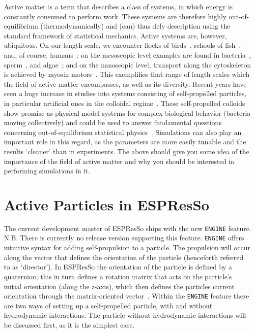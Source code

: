 \documentclass[aip,jcp,reprint,a4paper,onecolumn,amsmath]{revtex4-1}
\newcommand\code{\lstinline}
\newcommand{\es}{\mbox{\textsf{ESPResSo}}\xspace}
\begin{document}
Active matter is a term that describes a class of systems, in which energy is constantly consumed to perform work. These systems are therefore highly out-of-equilibrium (thermodynamically) and (can) thus defy description using the standard framework of statistical mechanics. Active systems are, however, ubiquitous. On our length scale, we encounter flocks of birds~\cite{Ballerini_08}, schools of fish~\cite{Katz_11}, and, of course, humans~\cite{Helbing_00,Zhang_13,Sliverberg_13}; on the mesoscopic level examples are found in bacteria~\cite{Sokolov_07,Schwarz-Linek_12,Reufer_14}, sperm~\cite{Woolley_03,Riedel_05,Ma_14}, and algae~\cite{Polin_09,Geyer_13}; and on the nanoscopic level, transport along the cytoskeleton is achieved by myosin motors~\cite{Mizuno07}. This exemplifies that range of length scales which the field of active matter encompasses, as well as its diversity. Recent years have seen a huge increase in studies into systems consisting of self-propelled particles, in particular artificial ones in the colloidal regime~\cite{ismagilov,Paxton_04,Wang_06,Brown,Ebbens,Ebbens_12,Howse_07,Valadares_10,simmchen,Yoshinaga,Baraban_13a,Buttinoni_12,Solovev_09,Mei_11}. These self-propelled colloids show promise as physical model systems for complex biological behavior (bacteria moving collectively) and could be used to answer fundamental questions concerning out-of-equilibrium statistical physics~\cite{Cates_12,Cates_14}. Simulations can also play an important role in this regard, as the parameters are more easily tunable and the results `cleaner' than in experiments. The above should give you some idea of the importance of the field of active matter and why you should be interested in performing simulations in it.

\section{\label{sec:swimming}Active Particles in ESPResSo }

The current development master of \es{} ships with the new \code{ENGINE} feature. N.B. There is currently no release version supporting this feature. \code{ENGINE} offers intuitive syntax for adding self-propulsion to a particle. The propulsion will occur along the vector that defines the orientation of the particle (henceforth referred to as `director'). In \es{} the orientation of the particle is defined by a quaternion; this in turn defines a rotation matrix that acts on the particle's initial orientation (along the z-axis), which then defines the particles current orientation through the matrix-oriented vector~\cite{UG,Limbach_06,Arnold_13}. Within the \code{ENGINE} feature there are two ways of setting up a self-propelled particle, with and without hydrodynamic interactions. The particle without hydrodynamic interactions will be discussed first, as it is the simplest case.
\end{document}
